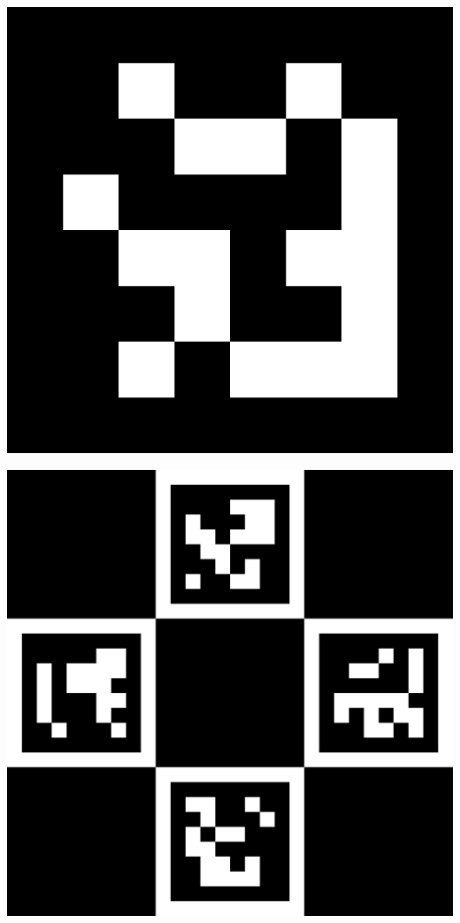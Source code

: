 \newpage
\myemptypage
\vspace{5cm}
\begin{center}
\includegraphics[width=\textwidth, keepaspectratio]{aruco_11.png}
\end{center}
\newpage
\myemptypage
\vspace{5cm}
\begin{center}
\includegraphics[width=\textwidth, keepaspectratio]{caruco_board.png}
\end{center}
\newpage
\myemptypage

